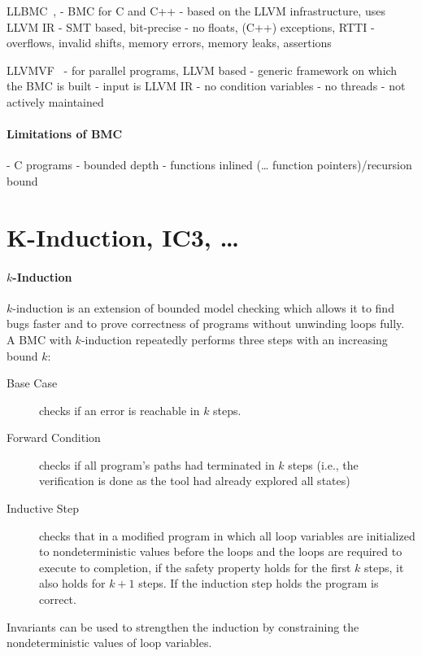 LLBMC~\cite{Merz2012}, \cite{Falke2013}
- BMC for C and C++
- based on the LLVM infrastructure, uses LLVM IR
- SMT based, bit-precise
- no floats, (C++) exceptions, RTTI
- overflows, invalid shifts, memory errors, memory leaks, assertions

LLVMVF~\cite{Sousa2013}
- for parallel programs, LLVM based
- generic framework on which the BMC is built
- input is LLVM IR
- no condition variables
- no threads
- not actively maintained 

\paragraph{Limitations of BMC}

- C programs
- bounded depth
- functions inlined (… function pointers)/recursion bound

\section{K-Induction, IC3, …}

\paragraph{$k$-Induction}

$k$-induction is an extension of bounded model checking which allows it to find bugs faster and to prove correctness of programs without unwinding loops fully.
A BMC with $k$-induction repeatedly performs three steps with an increasing bound $k$:
\begin{description}
    \item[Base Case] checks if an error is reachable in $k$ steps.
    \item[Forward Condition] checks if all program's paths had terminated in $k$ steps (i.e., the verification is done as the tool had already explored all states)
    \item[Inductive Step] checks that in a modified program in which all loop variables are initialized to nondeterministic values before the loops and the loops are required to execute to completion,\footnotemark{} if the safety property holds for the first $k$ steps, it also holds for $k+1$ steps. If the induction step holds the program is correct.
\end{description}
Invariants can be used to strengthen the induction by constraining the nondeterministic values of loop variables.
\cite{Cordeiro2016:23-27}

